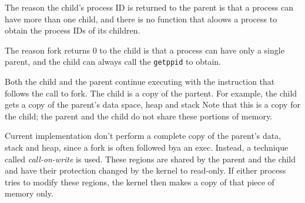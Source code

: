\documentclass[a4paper,10pt]{book}
\begin{document}
The reason the child's process ID is returned to the parent is that a process
can have more than one child, and there is no function that aloows a process to
obtain the process IDs of its children.

The reason fork returns 0 to the child is that a process can have only a single
parent, and the child can always call the \verb|getppid| to obtain.

Both the child and the parent continue executing with the instruction that
follows the call to fork. The child is a copy of the partent. For example, the
child gets a copy of the parent's data space, heap and stack Note that this is a
copy for the child; the parent and the child do not share these portions of
memory. 

Current implementation don't perform a complete copy of the parent's data, stack
and heap, since a fork is often followed bya an exec. Instead, a technique
called \emph{call-on-write} is used. These regions are shared by the parent and
the child and have their protection changed by the kernel to read-only. If
either process tries to modify these regions, the kernel then makes a copy of
that piece of memory only.
\end{document}
